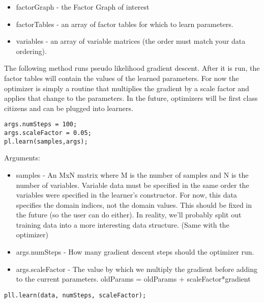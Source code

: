 \ifjava
\begin{itemize}
\item factorGraph - the Factor Graph of interest
\item factorTables - an array of factor tables for which to learn parameters.
\item variables - an array of variable matrices (the order must match your data ordering).
\end{itemize}
\fi


The following method runs pseudo likelihood gradient descent.  After it is run, the factor tables will contain the values of the learned parameters.  For now the optimizer is simply a routine that multiplies the gradient by a scale factor and applies that change to the parameters.  In the future, optimizers will be first class citizens and can be plugged into learners.

\ifmatlab
\begin{lstlisting}
args.numSteps = 100;
args.scaleFactor = 0.05;
pl.learn(samples,args);
\end{lstlisting}

Arguments:
\begin{itemize}
\item samples - An MxN matrix where M is the number of samples and N is the number of variables.  Variable data must be specified in the same order the variables were specified in the learner's constructor.  For now, this data specifies the domain indices, not the domain values.  This should be fixed in the future (so the user can do either).  In reality, we'll probably split out training data into a more interesting data structure.  (Same with the optimizer) 
\item args.numSteps - How many gradient descent steps should the optimizer run. 
\item args.scaleFactor - The value by which we multiply the gradient before adding to the current parameters.  oldParams = oldParams + scaleFactor*gradient
\end{itemize}

\fi

\ifjava
\begin{lstlisting}
pll.learn(data, numSteps, scaleFactor);
\end{lstlisting}


